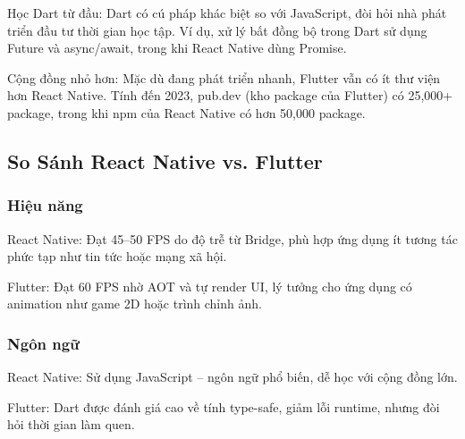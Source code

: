   \begin{flushleft}
    \hspace*{0.8cm}Học Dart từ đầu: Dart có cú pháp khác biệt so với JavaScript, đòi hỏi nhà phát triển đầu tư thời gian học tập. Ví dụ, xử lý bất đồng bộ trong Dart sử dụng Future và async/await, trong khi React Native dùng Promise.
  \end{flushleft}

  \begin{flushleft}
    \hspace*{0.8cm}Cộng đồng nhỏ hơn: Mặc dù đang phát triển nhanh, Flutter vẫn có ít thư viện hơn React Native. Tính đến 2023, pub.dev (kho package của Flutter) có 25,000+ package, trong khi npm của React Native có hơn 50,000 package.
  \end{flushleft}

\subsection{So Sánh React Native vs. Flutter}
\renewcommand{\labelitemi}{--}    
\subsubsection{Hiệu năng}
\begin{flushleft}
  \hspace*{0.8cm}React Native: Đạt 45–50 FPS do độ trễ từ Bridge, phù hợp ứng dụng ít tương tác phức tạp như tin tức hoặc mạng xã hội.
\end{flushleft}

\begin{flushleft}
    \hspace*{0.8cm}Flutter: Đạt 60 FPS nhờ AOT và tự render UI, lý tưởng cho ứng dụng có animation như game 2D hoặc trình chỉnh ảnh.
  \end{flushleft}

\subsubsection{Ngôn ngữ}
    \begin{flushleft}
      \hspace*{0.8cm}React Native: Sử dụng JavaScript – ngôn ngữ phổ biến, dễ học với cộng đồng lớn.
    \end{flushleft}

    \begin{flushleft}
        \hspace*{0.8cm}Flutter: Dart được đánh giá cao về tính type-safe, giảm lỗi runtime, nhưng đòi hỏi thời gian làm quen.
      \end{flushleft}

